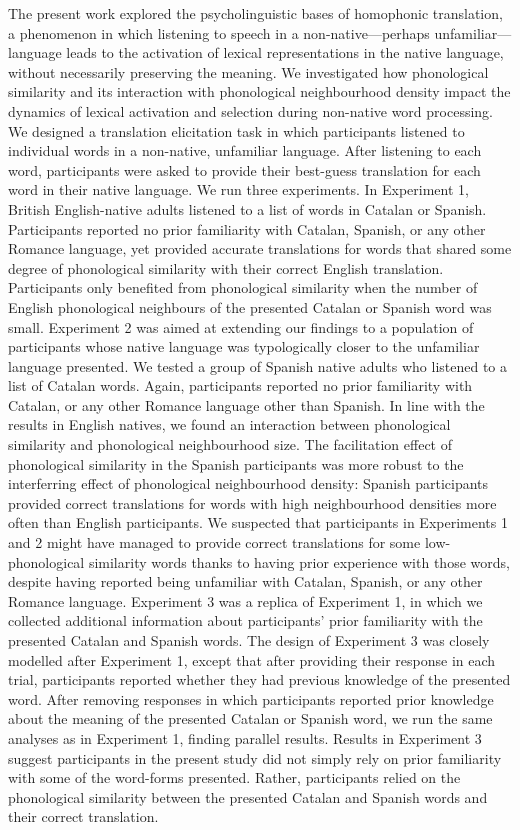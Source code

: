 \documentclass[
]{article}
\begin{document}
The present work explored the psycholinguistic bases of homophonic
translation, a phenomenon in which listening to speech in a
non-native---perhaps unfamiliar---language leads to the activation of
lexical representations in the native language, without necessarily
preserving the meaning. We investigated how phonological similarity and
its interaction with phonological neighbourhood density impact the
dynamics of lexical activation and selection during non-native word
processing. We designed a translation elicitation task in which
participants listened to individual words in a non-native, unfamiliar
language. After listening to each word, participants were asked to
provide their best-guess translation for each word in their native
language. We run three experiments. In Experiment 1, British
English-native adults listened to a list of words in Catalan or Spanish.
Participants reported no prior familiarity with Catalan, Spanish, or any
other Romance language, yet provided accurate translations for words
that shared some degree of phonological similarity with their correct
English translation. Participants only benefited from phonological
similarity when the number of English phonological neighbours of the
presented Catalan or Spanish word was small. Experiment 2 was aimed at
extending our findings to a population of participants whose native
language was typologically closer to the unfamiliar language presented.
We tested a group of Spanish native adults who listened to a list of
Catalan words. Again, participants reported no prior familiarity with
Catalan, or any other Romance language other than Spanish. In line with
the results in English natives, we found an interaction between
phonological similarity and phonological neighbourhood size. The
facilitation effect of phonological similarity in the Spanish
participants was more robust to the interferring effect of phonological
neighbourhood density: Spanish participants provided correct
translations for words with high neighbourhood densities more often than
English participants. We suspected that participants in Experiments 1
and 2 might have managed to provide correct translations for some
low-phonological similarity words thanks to having prior experience with
those words, despite having reported being unfamiliar with Catalan,
Spanish, or any other Romance language. Experiment 3 was a replica of
Experiment 1, in which we collected additional information about
participants' prior familiarity with the presented Catalan and Spanish
words. The design of Experiment 3 was closely modelled after Experiment
1, except that after providing their response in each trial,
participants reported whether they had previous knowledge of the
presented word. After removing responses in which participants reported
prior knowledge about the meaning of the presented Catalan or Spanish
word, we run the same analyses as in Experiment 1, finding parallel
results. Results in Experiment 3 suggest participants in the present
study did not simply rely on prior familiarity with some of the
word-forms presented. Rather, participants relied on the phonological
similarity between the presented Catalan and Spanish words and their
correct translation.
\end{document}
